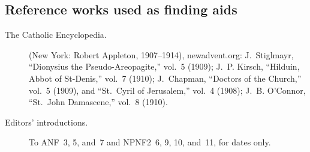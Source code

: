 \subsection*{Reference works used as finding aids}
\begin{description}
\item[The Catholic Encyclopedia.] (New York: Robert Appleton, 1907--1914),
  newadvent.org: J.~Stiglmayr, ``Dionysius the Pseudo-Areopagite,''
  vol.~5 (1909); J.~P. Kirsch, ``Hilduin, Abbot of St-Denis,'' vol.~7
  (1910); J.~Chapman, ``Doctors of the Church,'' vol.~5 (1909), and
  ``St.\ Cyril of Jerusalem,'' vol.~4 (1908); J.~B. O'Connor, ``St.\ John
  Damascene,'' vol.~8 (1910).
\item[Editors' introductions.] To ANF~3, 5, and~7 and NPNF2~6, 9, 10, and~11,
  for dates only.
\end{description}
\endgroup
